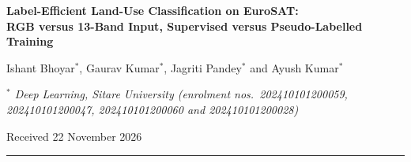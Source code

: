 \documentclass[twoside,a4paper,11pt]{article}
\begin{document}
\thispagestyle{plain}

\begin{center}
{\fontsize{16}{19}\selectfont\bfseries Label-Efficient Land-Use Classification on EuroSAT:\\
RGB versus 13-Band Input, Supervised versus Pseudo-Labelled Training\par}
\vspace{14pt}
{\large Ishant Bhoyar$^{*}$, Gaurav Kumar$^{*}$, Jagriti Pandey$^{*}$ and Ayush Kumar$^{*}$\par}
\vspace{9pt}
{\small\itshape $^{*}$ Deep Learning, Sitare University (enrolment nos.\ 202410101200059, 202410101200047,
202410101200060 and 202410101200028)\par}
\vspace{6pt}
{\small Received 22 November 2026\par}
\end{center}
\begingroup\renewcommand{\thefootnote}{}%
%
\endgroup
\vspace{8pt}
\noindent\rule{\textwidth}{0.4pt}
\vspace{4pt}
\end{document}
